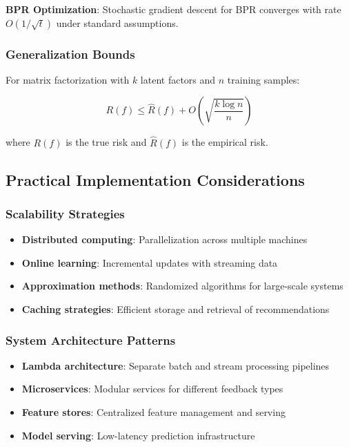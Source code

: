 \textbf{BPR Optimization}: Stochastic gradient descent for BPR converges with rate $O(1/\sqrt{t})$ under standard assumptions.

\subsubsection{Generalization Bounds}
For matrix factorization with $k$ latent factors and $n$ training samples:

\begin{equation}
R(f) \leq \hat{R}(f) + O\left(\sqrt{\frac{k \log n}{n}}\right)
\end{equation}

where $R(f)$ is the true risk and $\hat{R}(f)$ is the empirical risk.

\subsection{Practical Implementation Considerations}

\subsubsection{Scalability Strategies}
\begin{itemize}
    \item \textbf{Distributed computing}: Parallelization across multiple machines
    \item \textbf{Online learning}: Incremental updates with streaming data
    \item \textbf{Approximation methods}: Randomized algorithms for large-scale systems
    \item \textbf{Caching strategies}: Efficient storage and retrieval of recommendations
\end{itemize}

\subsubsection{System Architecture Patterns}
\begin{itemize}
    \item \textbf{Lambda architecture}: Separate batch and stream processing pipelines
    \item \textbf{Microservices}: Modular services for different feedback types
    \item \textbf{Feature stores}: Centralized feature management and serving
    \item \textbf{Model serving}: Low-latency prediction infrastructure
\end{itemize}

